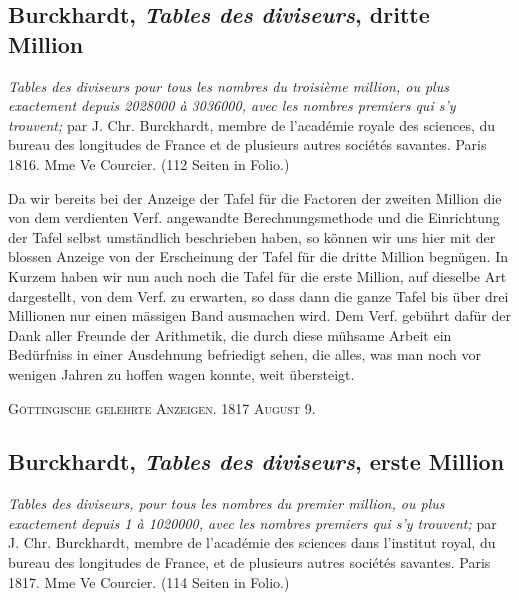 \documentclass[12pt]{article}
\begin{document}
\subsection*{Burckhardt, \textit{Tables des diviseurs}, dritte Million}

\begin{center}
\textit{Tables des diviseurs pour tous les nombres du troisième million, ou plus exactement depuis 2028000 à 3036000, avec les nombres premiers qui s'y trouvent;} par J. Chr. Burckhardt, membre de l'académie royale des sciences, du bureau des longitudes de France et de plusieurs autres sociétés savantes. Paris 1816. Mme Ve Courcier. (112 Seiten in Folio.)
\end{center}

Da wir bereits bei der Anzeige der Tafel für die Factoren der zweiten Million die von dem verdienten Verf. angewandte Berechnungsmethode und die Einrichtung der Tafel selbst umständlich beschrieben haben, so können wir uns hier mit der blossen Anzeige von der Erscheinung der Tafel für die dritte Million begnügen. In Kurzem haben wir nun auch noch die Tafel für die erste Million, auf dieselbe Art dargestellt, von dem Verf. zu erwarten, so dass dann die ganze Tafel bis über drei Millionen nur einen mässigen Band ausmachen wird. Dem Verf. gebührt dafür der Dank aller Freunde der Arithmetik, die durch diese mühsame Arbeit ein Bedürfniss in einer Ausdehnung befriedigt sehen, die alles, was man noch vor wenigen Jahren zu hoffen wagen konnte, weit übersteigt.

\begin{center}
\textsc{Göttingische gelehrte Anzeigen. 1817 August 9.}
\end{center}

\subsection*{Burckhardt, \textit{Tables des diviseurs}, erste Million}

\begin{center}
\textit{Tables des diviseurs, pour tous les nombres du premier million, ou plus exactement depuis 1 à 1020000, avec les nombres premiers qui s'y trouvent;} par J. Chr. Burckhardt, membre de l'académie des sciences dans l'institut royal, du bureau des longitudes de France, et de plusieurs autres sociétés savantes. Paris 1817. Mme Ve Courcier. (114 Seiten in Folio.)
\end{center}
\end{document}
